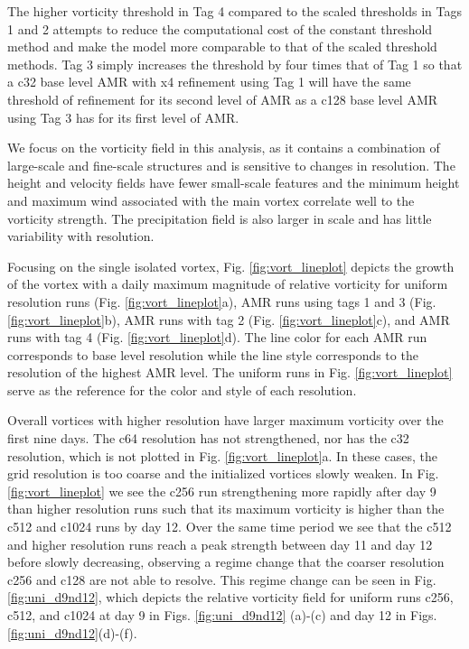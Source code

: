 \documentclass{ametsoc}
\begin{document}
The higher vorticity threshold in Tag 4 compared to the scaled thresholds in 
Tags 1 and 2 attempts to reduce the computational cost of the constant threshold
method and make the model more comparable to that of the scaled threshold methods. Tag 3 simply increases 
the threshold by four times that of Tag 1 so that a c32 base level AMR with x4 refinement
using Tag 1 will have the same threshold of refinement for its second level of AMR as a c128 base level
AMR using Tag 3 has for its first level of AMR.

We focus on the vorticity field in this analysis, as it contains a combination of large-scale 
and fine-scale structures and is sensitive to changes in resolution. The height and
velocity fields have fewer small-scale features and the minimum height and maximum wind
associated with the main vortex correlate well to the vorticity strength. The precipitation
field is also larger in scale and has little variability with resolution.

Focusing on the single isolated vortex, Fig. \ref{fig:vort_lineplot} depicts the growth of the vortex with a daily
maximum magnitude of relative vorticity for uniform resolution runs (Fig.
\ref{fig:vort_lineplot}a), AMR runs using tags 1 and 3 (Fig. \ref{fig:vort_lineplot}b), AMR runs 
with tag 2 (Fig. \ref{fig:vort_lineplot}c), and AMR runs with tag 4 (Fig. \ref{fig:vort_lineplot}d).
The line color for each AMR run corresponds to base level resolution while the line style corresponds
to the resolution of the highest AMR level. The uniform runs in Fig. \ref{fig:vort_lineplot} serve as the
reference for the color and style of each resolution. 

Overall vortices with higher resolution have larger
maximum vorticity over the first nine days. The c64 resolution has not strengthened, nor has
the c32 resolution, which is not plotted in Fig. \ref{fig:vort_lineplot}a. 
In these cases, the grid resolution is
too coarse and the initialized vortices slowly weaken.
In Fig. \ref{fig:vort_lineplot} we see the c256 run strengthening 
more rapidly after day 9 than higher resolution runs such
that its maximum vorticity is higher than the c512 and c1024 runs by day 12.  Over the same time 
period we see that the c512 and higher resolution runs reach a peak strength between day 11 and day 12
before slowly decreasing, observing a regime change that the coarser resolution c256 and c128 are not
able to resolve. This regime change can be seen in Fig. \ref{fig:uni_d9nd12}, which 
depicts the relative vorticity field for uniform runs c256, c512, and c1024 at day 9 in
Figs. \ref{fig:uni_d9nd12} (a)-(c) and day 12 in Figs. \ref{fig:uni_d9nd12}(d)-(f).
\end{document}
